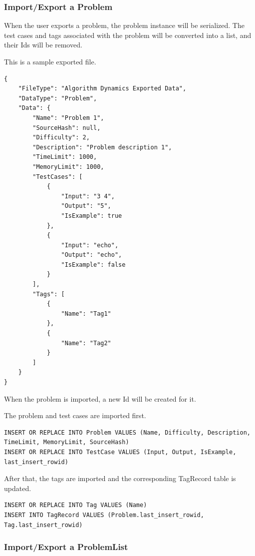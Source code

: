 \documentclass[a4paper]{report}
\begin{document}
\subsubsection{Import/Export a Problem}

When the user exports a problem, the problem instance will be serialized. The test cases and tags associated with the problem will be converted into a list, and their Ids will be removed.

This is a sample exported file.

\begin{verbatim}
{
    "FileType": "Algorithm Dynamics Exported Data",
    "DataType": "Problem",
    "Data": {
        "Name": "Problem 1",
        "SourceHash": null,
        "Difficulty": 2,
        "Description": "Problem description 1",
        "TimeLimit": 1000,
        "MemoryLimit": 1000,
        "TestCases": [
            {
                "Input": "3 4",
                "Output": "5",
                "IsExample": true
            },
            {
                "Input": "echo",
                "Output": "echo",
                "IsExample": false
            }
        ],
        "Tags": [
            {
                "Name": "Tag1"
            },
            {
                "Name": "Tag2"
            }
        ]
    }
}
\end{verbatim}

When the problem is imported, a new Id will be created for it.

The problem and test cases are imported first.

\begin{verbatim}
INSERT OR REPLACE INTO Problem VALUES (Name, Difficulty, Description, TimeLimit, MemoryLimit, SourceHash)
INSERT OR REPLACE INTO TestCase VALUES (Input, Output, IsExample, last_insert_rowid)
\end{verbatim}

After that, the tags are imported and the corresponding TagRecord table is updated.

\begin{verbatim}
INSERT OR REPLACE INTO Tag VALUES (Name)
INSERT INTO TagRecord VALUES (Problem.last_insert_rowid, Tag.last_insert_rowid)
\end{verbatim}

\subsubsection{Import/Export a ProblemList}
\end{document}
